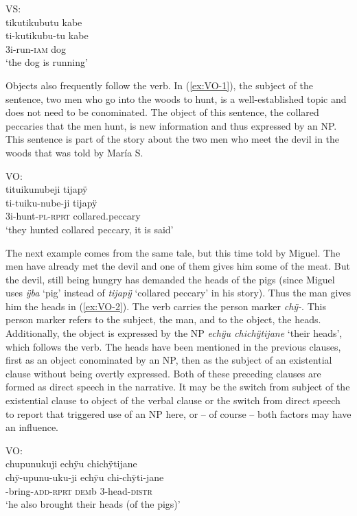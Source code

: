 \ea\label{ex:SUBJ-follow}
\begingl 
\glpreamble \textup{VS:}\\tikutikubutu kabe\\
\gla ti-kutikubu-tu kabe\\ 
\glb 3i-run-\textsc{iam} dog\\ 
\glft ‘the dog is running’\\ 
\endgl
\trailingcitation{[jxx-a120516l-a.146]}
\xe

Objects also frequently follow the verb. In (\ref{ex:VO-1}), the subject of the sentence, two men who go into the woods to hunt, is a well-established topic and does not need to be conominated. The object of this sentence, the collared peccaries that the men hunt, is new information and thus expressed by an NP. This sentence is part of the story about the two men who meet the devil in the woods that was told by María S.

\ea\label{ex:VO-1}
\begingl
\glpreamble \textup{VO:}\\tituikunubeji tijapÿ\\
\gla ti-tuiku-nube-ji tijapÿ\\
\glb 3i-hunt-\textsc{pl}-\textsc{rprt} collared.peccary\\
\glft ‘they hunted collared peccary, it is said’
\endgl
\trailingcitation{[rxx-n120511l-2.17]}
\xe

The next example comes from the same tale, but this time told by Miguel. The men have already met the devil and one of them gives him some of the meat. But the devil, still being hungry has demanded the heads of the pigs (since Miguel uses \textit{ÿba} ‘pig’ instead of \textit{tijapÿ} ‘collared peccary’ in his story). Thus the man gives him the heads in (\ref{ex:VO-2}). The verb carries the person marker \textit{chÿ-}. This person marker refers to the subject, the man, and to the object, the heads. Additionally, the object is expressed by the NP \textit{echÿu chichÿtijane} ‘their heads’, which follows the verb. The heads have been mentioned in the previous clauses, first as an object conominated by an NP, then as the subject of an existential clause without being overtly expressed. Both of these preceding clauses are formed as direct speech in the narrative. It may be the switch from subject of the existential clause to object of the verbal clause or the switch from direct speech to report that triggered use of an NP here, or – of course – both factors may have an influence.


\ea\label{ex:VO-2}
\begingl
\glpreamble \textup{VO:}\\chupunukuji echÿu chichÿtijane\\
\gla chÿ-upunu-uku-ji echÿu chi-chÿti-jane\\
-bring-\textsc{add}-\textsc{rprt} \textsc{dem}b 3-head-\textsc{distr}\\
\glft ‘he also brought their heads (of the pigs)’
\endgl
\trailingcitation{[mxx-n101017s-1.050]}
\xe

